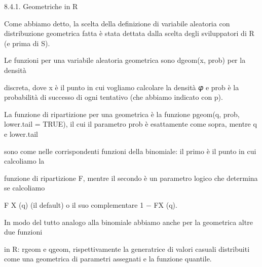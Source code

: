\documentclass[a4paper,portrait,12pt]{article}
\begin{document}
\begin{flushleft}
8.4.1. Geometriche in R
\end{flushleft}


\begin{flushleft}
Come abbiamo detto, la scelta della definizione di variabile aleatoria con distribuzione geometrica fatta \`{e} stata dettata dalla scelta degli sviluppatori di R (e prima di S).
\end{flushleft}


\begin{flushleft}
Le funzioni per una variabile aleatoria geometrica sono dgeom(x, prob) per la densit\`{a}
\end{flushleft}


\begin{flushleft}
discreta, dove x \`{e} il punto in cui vogliamo calcolare la densit\`{a} 𝜑 e prob \`{e} la probabilit\`{a} di successo di ogni tentativo (che abbiamo indicato con p).
\end{flushleft}


\begin{flushleft}
La funzione di ripartizione per una geometrica \`{e} la funzione pgeom(q, prob, lower.tail = TRUE), il cui il parametro prob \`{e} esattamente come sopra, mentre q e lower.tail
\end{flushleft}


\begin{flushleft}
sono come nelle corrispondenti funzioni della binomiale: il primo \`{e} il punto in cui calcoliamo la
\end{flushleft}


\begin{flushleft}
funzione di ripartizione F, mentre il secondo \`{e} un parametro logico che determina se calcoliamo
\end{flushleft}


\begin{flushleft}
F X (q) (il default) o il suo complementare 1 $-$ FX (q).
\end{flushleft}


\begin{flushleft}
In modo del tutto analogo alla binomiale abbiamo anche per la geometrica altre due funzioni
\end{flushleft}


\begin{flushleft}
in R: rgeom e qgeom, rispettivamente la generatrice di valori casuali distribuiti come una geometrica di parametri assegnati e la funzione quantile.
\end{flushleft}
\end{document}
